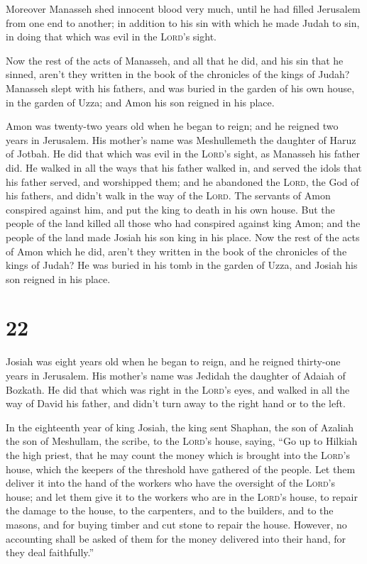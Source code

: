  Moreover Manasseh shed innocent blood very much, until
he had filled Jerusalem from one end to another; in addition to his sin
with which he made Judah to sin, in doing that which was evil in the
\textsc{Lord}'s sight.

 Now the rest of the acts of Manasseh, and all that he
did, and his sin that he sinned, aren't they written in the book of the
chronicles of the kings of Judah?  Manasseh slept with
his fathers, and was buried in the garden of his own house, in the
garden of Uzza; and Amon his son reigned in his place.

 Amon was twenty-two years old when he began to reign;
and he reigned two years in Jerusalem. His mother's name was
Meshullemeth the daughter of Haruz of Jotbah.  He did
that which was evil in the \textsc{Lord}'s sight, as Manasseh his father
did.  He walked in all the ways that his father walked
in, and served the idols that his father served, and worshipped them;
 and he abandoned the \textsc{Lord}, the God of his
fathers, and didn't walk in the way of the \textsc{Lord}.
 The servants of Amon conspired against him, and put the
king to death in his own house.  But the people of the
land killed all those who had conspired against king Amon; and the
people of the land made Josiah his son king in his place.
 Now the rest of the acts of Amon which he did, aren't
they written in the book of the chronicles of the kings of Judah?
 He was buried in his tomb in the garden of Uzza, and
Josiah his son reigned in his place.

\hypertarget{section-21}{%
\section{22}\label{section-21}}

 Josiah was eight years old when he began to reign, and he
reigned thirty-one years in Jerusalem. His mother's name was Jedidah the
daughter of Adaiah of Bozkath.  He did that which was
right in the \textsc{Lord}'s eyes, and walked in all the way of David
his father, and didn't turn away to the right hand or to the left.

 In the eighteenth year of king Josiah, the king sent
Shaphan, the son of Azaliah the son of Meshullam, the scribe, to the
\textsc{Lord}'s house, saying,  ``Go up to Hilkiah the
high priest, that he may count the money which is brought into the
\textsc{Lord}'s house, which the keepers of the threshold have gathered
of the people.  Let them deliver it into the hand of the
workers who have the oversight of the \textsc{Lord}'s house; and let
them give it to the workers who are in the \textsc{Lord}'s house, to
repair the damage to the house,  to the carpenters, and to
the builders, and to the masons, and for buying timber and cut stone to
repair the house.  However, no accounting shall be asked
of them for the money delivered into their hand, for they deal
faithfully.''

